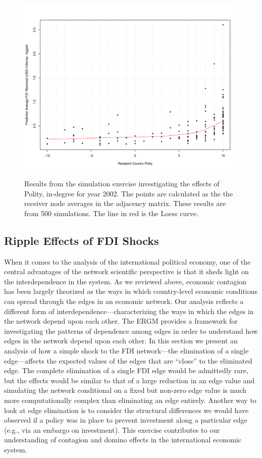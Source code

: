 \documentclass[reqno,onecolumn,letterpaper,12pt]{article}
\begin{document}
\begin{figure}[!h]
\centering
\includegraphics[scale=.55]{./draft_figures/polity_in_sims} \vspace{-.5cm}\\
\caption{\label{fig:polity} Results from the simulation exercise investigating the effects of Polity, in-degree for year 2002. The points are calculated as the the receiver node averages in the adjacency matrix. These results are from 500 simulations. The line in red is the Loess curve.}
\end{figure}

\subsection{Ripple Effects of FDI Shocks}\label{contagion}

When it comes to the analysis of the international political economy, one of the central advantages of the network scientific perspective is that it sheds light on the interdependence in the system. As we reviewed above, economic contagion has been largely theorized as the ways in which country-level economic conditions can spread through the edges in an economic network. Our analysis reflects a different form of interdependence---characterizing the ways in which the edges in the network depend upon each other. The ERGM provides a framework for investigating the patterns of dependence among edges in order to understand how edges in the network depend upon each other. In this section we present an analysis of how a simple shock to the FDI network---the elimination of a single edge---affects the expected values of the edges that are ``close'' to the eliminated edge. The complete elimination of a single FDI edge would be admittedly rare, but the effects would be similar to that of a large reduction in an edge value and simulating the network conditional on a fixed but non-zero edge value is much more computationally complex than eliminating an edge entirely. Another way to look at edge elimination is to consider the structural differences we would have observed if a policy was in place to prevent investment along a particular edge (e.g., via an embargo on investment). This exercise contributes to our understanding of contagion and domino effects in the international economic system.
\end{document}
